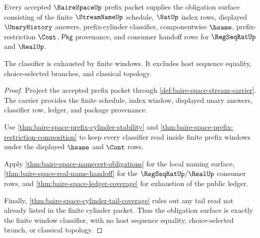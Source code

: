 \begin{theorem}
\label{thm:bairespace-obligation-window-classifier}
Every accepted $\BaireSpaceUp$ prefix packet supplies the obligation surface
consisting of the finite $\StreamNameUp$ schedule, $\NatUp$ index rows,
displayed $\UnaryHistory$ answers, prefix-cylinder classifier, componentwise
$\hsame$, prefix-restriction $\Cont$, $\mathsf{Pkg}$ provenance, and consumer
handoff rows for $\RegSeqRatUp$ and $\RealUp$.

The classifier is exhausted by finite windows. It excludes host sequence
equality, choice-selected branches, and classical topology.
\end{theorem}
\begin{proof}
Project the accepted prefix packet through
\autoref{def:baire-space-stream-carrier}. The carrier provides the finite
schedule, index window, displayed unary answers, classifier row, ledger, and
package provenance.

Use \autoref{thm:baire-space-prefix-cylinder-stability} and
\autoref{thm:baire-space-prefix-restriction-composition} to keep every
classifier read inside finite prefix windows under the displayed $\hsame$ and
$\Cont$ rows.

Apply \autoref{thm:baire-space-namecert-obligations} for the local naming
surface, \autoref{thm:baire-space-real-name-handoff} for the
$\RegSeqRatUp/\RealUp$ consumer rows, and \autoref{thm:baire-space-ledger-coverage}
for exhaustion of the public ledger.

Finally, \autoref{thm:baire-space-cylinder-tail-coverage} rules out any tail
read not already listed in the finite cylinder packet. Thus the obligation
surface is exactly the finite window classifier, with no host sequence equality,
choice-selected branch, or classical topology.
\end{proof}

